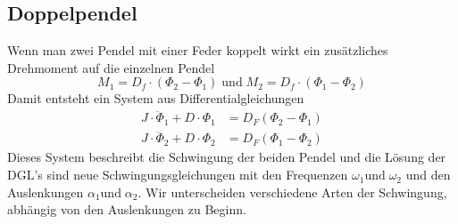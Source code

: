 \subsection{Doppelpendel}
Wenn man zwei Pendel mit einer Feder koppelt wirkt ein zusätzliches Drehmoment auf die einzelnen Pendel 
\begin{equation*}
    M_1 = D_f\cdot (\Phi_2-\Phi_1)\; \text{und} \;M_2=D_f\cdot (\Phi_1-\Phi_2)
\end{equation*}
Damit entsteht ein System aus Differentialgleichungen
\begin{align*}
    J\cdot \ddot{\Phi}_1 + D \cdot \Phi_1 &= D_F (\Phi_2 - \Phi_1) \\
    J\cdot \ddot{\Phi}_2 + D \cdot \Phi_2 &= D_F (\Phi_1 - \Phi_2)
\end{align*}
Dieses System beschreibt die Schwingung der beiden Pendel und die Lösung der DGL's sind neue Schwingungsgleichungen mit den Frequenzen $\omega_1 \text{und} \;\omega_2$ und den  Auslenkungen $\alpha_1 \text{und}\; \alpha_2$.
Wir unterscheiden verschiedene Arten der Schwingung, abhängig von den Auslenkungen zu Beginn.

